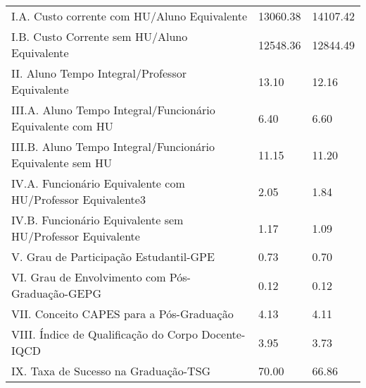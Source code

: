 \documentclass{report}
\begin{document}
\begin{tabular}{lll}
I.A. Custo corrente com HU/Aluno Equivalente                &  13060.38 &  14107.42 \\
I.B. Custo Corrente sem HU/Aluno Equivalente                &  12548.36 &  12844.49 \\
II. Aluno Tempo Integral/Professor Equivalente              &  13.10 &  12.16 \\
III.A. Aluno Tempo Integral/Funcionário Equivalente com HU  &  6.40 &  6.60 \\
III.B. Aluno Tempo Integral/Funcionário Equivalente sem HU  &  11.15 &  11.20 \\
IV.A. Funcionário Equivalente com HU/Professor Equivalente3 &  2.05 &  1.84 \\
IV.B. Funcionário Equivalente sem HU/Professor Equivalente  &  1.17 &  1.09 \\
V. Grau de Participação Estudantil-GPE                      &  0.73 &  0.70 \\
VI. Grau de Envolvimento com Pós-Graduação-GEPG             &  0.12 &  0.12 \\
VII. Conceito CAPES para a Pós-Graduação                    &  4.13 &  4.11 \\
VIII. Índice de Qualificação do Corpo Docente-IQCD          &  3.95 &  3.73 \\
IX. Taxa de Sucesso na Graduação-TSG                        &  70.00 &  66.86 \\
\bottomrule
\end{tabular}
\newpage
\end{document}
